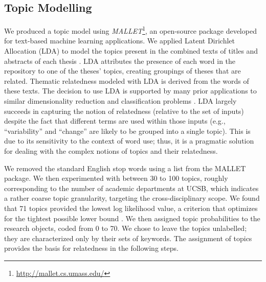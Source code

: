 \documentclass[a4paper,UKenglish]{lipics-v2018}
\begin{document}
\subsection{Topic Modelling}
We produced a topic model using \textit{MALLET}\footnote{\url{http://mallet.cs.umass.edu/}}, an open-source package developed for text-based machine learning applications. We applied Latent Dirichlet Allocation (LDA) to model the topics present in the combined texts of titles and abstracts of each thesis \cite{Blei2003c}. LDA attributes the presence of each word in the repository to one of the theses’ topics, creating groupings of theses that are related. Thematic relatedness modeled with LDA is derived from the words of these texts. The decision to use LDA is supported by many prior applications to similar dimensionality reduction and classification problems \cite{Blei2003c}. LDA largely succeeds in capturing the notion of relatedness (relative to the set of inputs) despite the fact that  different terms are used within those inputs (e.g., “variability” and “change” are likely to be grouped into a single topic). This is due to its sensitivity to the context of word use; thus, it is a pragmatic solution for dealing with the complex notions of topics and their relatedness.

We removed the standard English stop words using a list from the MALLET package. We then experimented with between 30 to 100 topics, roughly corresponding to the number of academic departments at UCSB, which indicates a rather coarse topic granularity, targeting the cross-disciplinary scope. We found that 71 topics provided the lowest log likelihood value, a criterion that optimizes for the tightest possible lower bound \cite{Blei2003c}. We then assigned topic probabilities to the research objects, coded from 0 to 70. We chose to leave the topics unlabelled; they are characterized only by their sets of keywords. The assignment of topics provides the basis for relatedness in the following steps.
\end{document}
